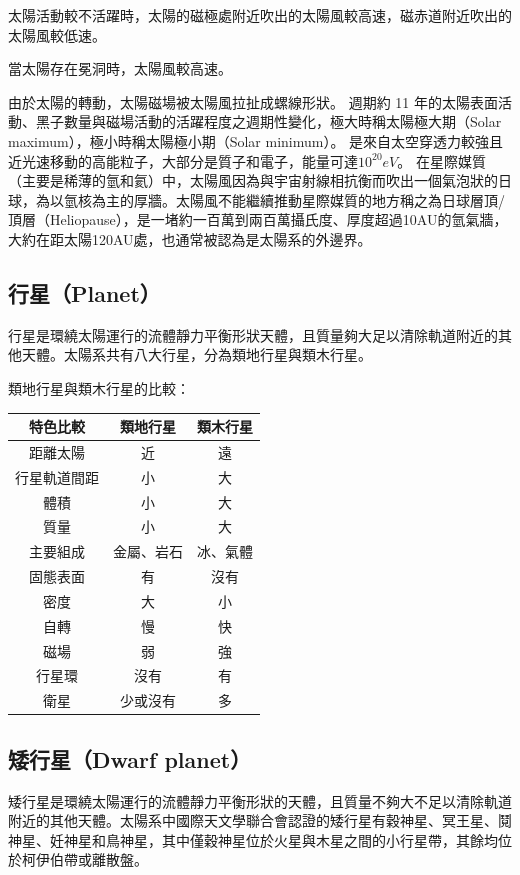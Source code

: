 \documentclass[a4paper,12pt]{report}
\begin{document}
太陽活動較不活躍時，太陽的磁極處附近吹出的太陽風較高速，磁赤道附近吹出的太陽風較低速。

當太陽存在冕洞時，太陽風較高速。

由於太陽的轉動，太陽磁場被太陽風拉扯成螺線形狀。
週期約 11 年的太陽表面活動、黑子數量與磁場活動的活躍程度之週期性變化，極大時稱太陽極大期（Solar maximum），極小時稱太陽極小期（Solar minimum）。
是來自太空穿透力較強且近光速移動的高能粒子，大部分是質子和電子，能量可達$10^20 eV$。
在星際媒質（主要是稀薄的氫和氦）中，太陽風因為與宇宙射線相抗衡而吹出一個氣泡狀的日球，為以氫核為主的厚牆。太陽風不能繼續推動星際媒質的地方稱之為日球層頂/頂層（Heliopause），是一堵約一百萬到兩百萬攝氏度、厚度超過10AU的氫氣牆，大約在距太陽120AU處，也通常被認為是太陽系的外邊界。
\subsection{行星（Planet）}
行星是環繞太陽運行的流體靜力平衡形狀天體，且質量夠大足以清除軌道附近的其他天體。太陽系共有八大行星，分為類地行星與類木行星。

類地行星與類木行星的比較：
\begin{longtable}[c]{|c|c|c|}
\hline
\textbf{特色比較} & \textbf{類地行星} & \textbf{類木行星} \\ \hline
距離太陽 & 近 & 遠 \\ \hline
行星軌道間距 & 小 & 大 \\ \hline
體積 & 小 & 大 \\ \hline
質量 & 小 & 大 \\ \hline
主要組成 & 金屬、岩石 & 冰、氣體 \\ \hline
固態表面 & 有 & 沒有 \\ \hline
密度 & 大 & 小 \\ \hline
自轉 & 慢 & 快 \\ \hline
磁場 & 弱 & 強 \\ \hline
行星環 & 沒有 & 有 \\ \hline
衛星 & 少或沒有 & 多 \\ \hline
\end{longtable}
\subsection{矮行星（Dwarf planet）}
矮行星是環繞太陽運行的流體靜力平衡形狀的天體，且質量不夠大不足以清除軌道附近的其他天體。太陽系中國際天文學聯合會認證的矮行星有穀神星、冥王星、鬩神星、妊神星和鳥神星，其中僅穀神星位於火星與木星之間的小行星帶，其餘均位於柯伊伯帶或離散盤。
\end{document}
